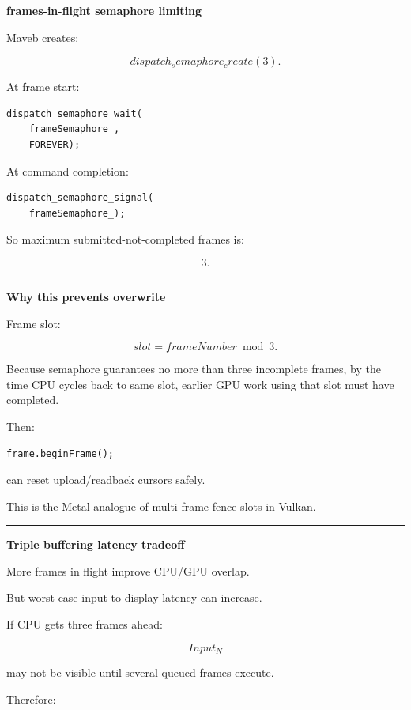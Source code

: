 \textbf{frames-in-flight semaphore limiting}

Maveb creates:

\[
dispatch_semaphore_create(3).
\]

At frame start:

\begin{verbatim}
dispatch_semaphore_wait(
    frameSemaphore_,
    FOREVER);
\end{verbatim}

At command completion:

\begin{verbatim}
dispatch_semaphore_signal(
    frameSemaphore_);
\end{verbatim}

So maximum submitted-not-completed frames is:

\[
\boxed{3}.
\]

\begin{center}\rule{0.5\linewidth}{0.5pt}\end{center}

\textbf{Why this prevents overwrite}

Frame slot:

\[
slot=
frameNumber\bmod3.
\]

Because semaphore guarantees no more than three incomplete frames, by the time CPU cycles back to same slot, earlier GPU work using that slot must have completed.

Then:

\begin{verbatim}
frame.beginFrame();
\end{verbatim}

can reset upload/readback cursors safely.

This is the Metal analogue of multi-frame fence slots in Vulkan.

\begin{center}\rule{0.5\linewidth}{0.5pt}\end{center}

\textbf{Triple buffering latency tradeoff}

More frames in flight improve CPU/GPU overlap.

But worst-case input-to-display latency can increase.

If CPU gets three frames ahead:

\[
Input_N
\]

may not be visible until several queued frames execute.

Therefore:

